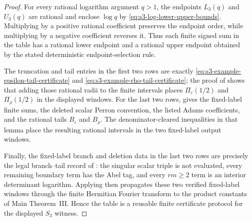 \documentclass[11pt,a4paper]{amsart}
\theoremstyle{plain}
\theoremstyle{definition}
\theoremstyle{remark}
\begin{document}
\begin{proof}
  For every rational logarithm argument \(q>1\), the endpoints
  \(L_3(q)\) and \(U_3(q)\) are rational and enclose \(\log q\) by
  \eqref{eq:s3-log-lower-upper-bounds}.  Multiplying by a positive rational
  coefficient preserves the endpoint order, while multiplying by a negative
  coefficient reverses it.  Thus each finite signed sum in the table has a
  rational lower endpoint and a rational upper endpoint obtained by the stated
  deterministic endpoint-selection rule.

  The truncation and tail entries in the first two rows are exactly
  \eqref{eq:s3-example-epsilon-tail-certificate} and
  \eqref{eq:s3-example-rho-tail-certificate}; the proof of
   shows that adding those rational
  radii to the finite intervals places \(\Pi_\varepsilon(1/2)\) and
  \(\Pi_\rho(1/2)\) in the displayed windows.  For the last two rows,
   gives the fixed-label finite
  sums, the deleted scalar Perron convention, the listed Adams coefficients,
  and the rational tails \(B_\varepsilon\) and \(B_\rho\).  The denominator-cleared
  inequalities in that lemma place the resulting rational intervals in the two
  fixed-label output windows.

  Finally, the fixed-label branch and deletion data in the last two rows are
  precisely the legal branch--tail record of
  : the singular scalar triple is not
  evaluated, every remaining boundary term has the Abel tag, and every
  \(rm\ge2\) term is an interior determinant logarithm.  Applying
   then propagates these two verified
  fixed-label windows through the finite Hermitian Fourier transform to the
  product constants of Main Theorem~III.  Hence the table is a reusable finite
  certificate protocol for the displayed \(S_3\) witness.
\end{proof}
\end{document}
